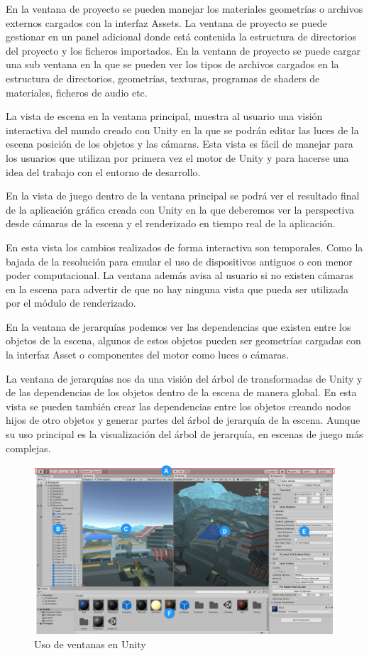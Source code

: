 \documentclass[a4paper, 17pt]{book}
\begin{document}
En la ventana de proyecto se pueden manejar los materiales geometrías o archivos externos cargados con la
interfaz Assets. La ventana de proyecto se puede gestionar en un panel adicional donde está contenida la
estructura de directorios del proyecto y los ficheros importados. En la ventana de proyecto se puede cargar
una sub ventana en la que se pueden ver los tipos de archivos cargados en la estructura de directorios,
geometrías, texturas, programas de shaders de materiales, ficheros de audio etc.

La vista de escena en la ventana principal, muestra al usuario una visión interactiva del mundo creado con
Unity en la que se podrán editar las luces de la escena posición de los objetos y las cámaras. Esta vista
es fácil de manejar para los usuarios que utilizan por primera vez el motor de Unity y para hacerse una
idea del trabajo con el entorno de desarrollo.

En la vista de juego dentro de la ventana principal se podrá ver el resultado final de la aplicación gráfica
creada con Unity en la que deberemos ver la perspectiva desde cámaras de la escena y el renderizado en tiempo
real de la aplicación. 

En esta vista los cambios realizados de forma interactiva son temporales. Como la bajada de la resolución para
emular el uso de dispositivos antiguos o con menor poder computacional. La ventana además avisa al usuario si
no existen cámaras en la escena para advertir de que no hay ninguna vista que pueda ser utilizada por el módulo
de renderizado.

En la ventana de jerarquías podemos ver las dependencias que existen entre los objetos de la escena, algunos de
estos objetos pueden ser geometrías cargadas con la interfaz Asset o componentes del motor como luces o cámaras. 

La ventana de jerarquías nos da una visión del árbol de transformadas de Unity y de las dependencias de los
objetos dentro de la escena de manera global. En esta vista se pueden también crear las dependencias entre
los objetos creando nodos hijos de otro objetos y generar partes del árbol de jerarquía de la escena. Aunque
su uso principal es la visualización del árbol de jerarquía, en escenas de juego más complejas.

\begin{figure}[hbt!]
    \centering
    \includegraphics[scale=0.40, keepaspectratio]{img/editor_unity.png}
    \caption{Uso de ventanas en Unity}
    \label{figura:editor_unity}
\end{figure}
\end{document}
